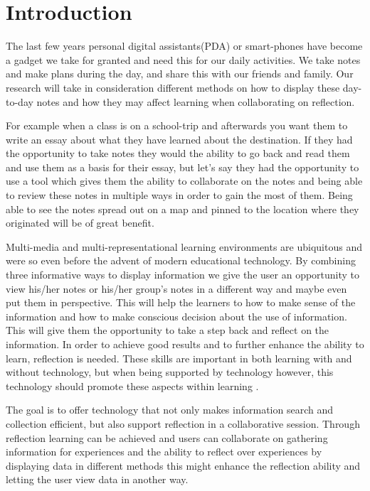 \chapter{Introduction}
The last few years personal digital assistants(PDA) or smart-phones have become a gadget we take for granted and need this for our daily activities.  We take notes and make plans during the day, and share this with our friends and family. Our research will take in consideration different methods on how to display these day-to-day notes and how they may affect learning when collaborating on reflection.

For example when a class is on a school-trip and afterwards you want them to write an essay about what they have learned about the destination. If they had the opportunity to take notes they would the ability to go back and read them and use them as a basis for their essay, but let’s say they had the opportunity to use a tool which gives them the ability to collaborate on the notes and being able to review these notes in multiple ways in order to gain the most of them. Being able to see the notes spread out on a map and pinned to the location where they originated will be of great benefit.

Multi-media and multi-representational learning environments are ubiquitous and were so even before the advent of modern educational technology.\cite{Ainsworth1999} By combining three informative ways to display information we give the user an opportunity to view his/her notes or his/her group’s notes in a different way and maybe even put them in perspective. This will help the learners to how to make sense of the information and how to make conscious decision about the use of information. This will give them the opportunity to take a step back and reflect on the information. In order to achieve good results and to further enhance the ability to learn, reflection is needed. These skills are important in both learning with and without technology, but when being supported by technology however, this technology should promote these aspects within learning \cite{Lin1999}.

The goal is to offer technology that not only makes information search and collection efficient, but also support reflection in a collaborative session. Through reflection learning can be achieved and users can collaborate on gathering information for experiences and the ability to reflect over experiences by displaying data in different methods this might enhance the reflection ability and letting the user view data in another way.

